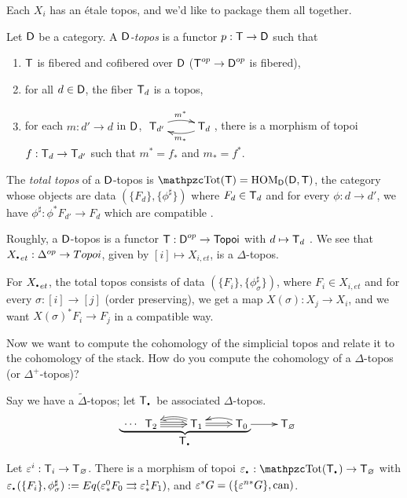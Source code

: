 Each $X_i$ has an \'etale topos, and we'd like to package them all together.
\begin{definition}
  Let $\text{\sf D}$ be a category. A \emph{$\text{\sf D}$-topos} is a functor $p:\text{\sf T}\to \text{\sf D}$ such that
  \begin{enumerate}
   \item $\text{\sf T}$ is fibered and cofibered over $\text{\sf D}$ ($\text{\sf T}^{op} \to \text{\sf D}^{op}$ is fibered),
   \item for all $d\in \text{\sf D}$, the fiber $\text{\sf T}_d$ is a topos,
   \item for each $m:d'\to d$ in $\text{\sf D}$, $\xymatrix{\T_{d'}\ar@/^/[r]^{m^*} & \T_d \ar@/^/[l]^{m_*}}$, there is a morphism of topoi $f:\text{\sf T}_d\to \text{\sf T}_{d'}$ such that $m^*=f_*$ and $m_*=f^*$. 
  \end{enumerate}
  The \emph{total topos} of a $\text{\sf D}$-topos is $\Tot(\T)=\HOM_\D(\D,\T)$, the category whose objects are data $(\{F_d\},\{\phi^\sharp\})$ where $F_d\in \text{\sf T}_d$ and for every $\phi:d\to d'$, we have $\phi^\sharp:\phi^*F_{d'}\to F_d$ which are compatible . 
\end{definition}

Roughly, a $\text{\sf D}$-topos is a functor $\text{\sf T}:\text{\sf D}^{op}\to \text{\sf Topoi}$ with $d\mapsto \text{\sf T}_d$ . We see that $X_{\udot et}:\Delta^{op}\to Topoi$, given by $[i]\mapsto X_{i,et}$, is a $\Delta$-topos.

\begin{example}
  For $X_{\udot et}$, the total topos consists of data $(\{F_i\},\{\phi_\sigma^\sharp\})$, where $F_i\in X_{i,et}$ and for every $\sigma:[i]\to [j]$ (order preserving), we get a map $X(\sigma):X_j\to X_i$, and we want $X(\sigma)^*F_i\to F_j$ in a compatible way.
\end{example}

Now we want to compute the cohomology of the simplicial topos and relate it to the cohomology of the stack. How do you compute the cohomology of a $\Delta$-topos (or $\Delta^+$-topos)?

Say we have a $\tilde \Delta$-topos; let $\T_\udot$ be associated $\Delta$-topos.
\[
 \xymatrix{
   {}& \T_2 \ar@3{->}[r]_(.75){\makebox[0pt]{$\underbrace{\hspace{10pc}}_{\mbox{$\T_\udot$}}$}}\ar@{}[l]|{\mbox{$\cdots$}} & \T_1 \ar@/_/@{=>}[l] \ar@{=>}[r] & \T_0 \ar[r]\ar@/_/[l] & \T_\varnothing
}\]
Let $\varepsilon^i:\text{\sf T}_i\to \text{\sf T}_\varnothing$. There is a morphism of topoi $\e_\udot:\Tot(\T_\udot)\to \T_\varnothing$ with $\e_\udot(\{F_i\},\phi_\sigma^\sharp):= Eq(\e_*^0F_0\rightrightarrows \e_*^1 F_1)$, and $\varepsilon^*G=(\{\varepsilon^{n*}G\},\text{can})$. 

